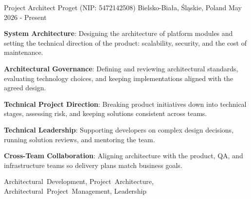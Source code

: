 \begin{cventries}
  \cventry
    {Project Architect} %
    {Proget (NIP: 5472142508)} %
    {Bielsko-Biała, Śląskie, Poland} %
    {May 2026 - Present} %
    {
      \begin{cvitems} %
        \item {\textbf{System Architecture}: Designing the architecture of platform modules and setting the technical direction of the product: scalability, security, and the cost of maintenance.}
        \item {\textbf{Architectural Governance}: Defining and reviewing architectural standards, evaluating technology choices, and keeping implementations aligned with the agreed design.}
        \item {\textbf{Technical Project Direction}: Breaking product initiatives down into technical stages, assessing risk, and keeping solutions consistent across teams.}
        \item {\textbf{Technical Leadership}: Supporting developers on complex design decisions, running solution reviews, and mentoring the team.}
        \item {\textbf{Cross-Team Collaboration}: Aligning architecture with the product, QA, and infrastructure teams so delivery plans match business goals.}
      \end{cvitems}
    }
    {Architectural~Development, Project~Architecture, Architectural~Project~Management, Leadership}


\end{cventries}
